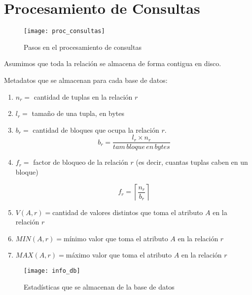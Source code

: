 \documentclass[a4paper, twoside]{article}
\begin{document}
\pagebreak{}


\part{Procesamiento de Consultas}

\noindent \begin{center}
\begin{figure}[H]
\noindent \begin{centering}
\texttt{[image: proc\_consultas]}
\par\end{centering}

\protect\caption{Pasos en el procesamiento de consultas}
\end{figure}

\par\end{center}

Asumimos que toda la relación se almacena de forma contigua en disco.

Metadatos que se almacenan para cada base de datos:
\begin{enumerate}
\item $n_{r}=$ cantidad de tuplas en la relación $r$
\item $l_{r}=$ tamaño de una tupla, en bytes
\item $b_{r}=$ cantidad de bloques que ocupa la relación $r$. 
\[
b_{r}=\frac{l_{r}\times n_{r}}{tam\, bloque\, en\, bytes}
\]

\item $f_{r}=$ factor de bloqueo de la relación $r$ (es decir, cuantas
tuplas caben en un bloque)


\[
f_{r}=\left\lceil \frac{n_{r}}{b_{r}}\right\rceil 
\]


\item $V(A,r)=$cantidad de valores distintos que toma el atributo $A$
en la relación $r$
\item $MIN(A,r)=$mínimo valor que toma el atributo $A$ en la relación
$r$
\item $MAX(A,r)=$máximo valor que toma el atributo $A$ en la relación
$r$
\end{enumerate}
\begin{figure}[H]
\noindent \begin{centering}
\texttt{[image: info\_db]}
\par\end{centering}

\protect\caption{Estadísticas que se almacenan de la base de datos}
\end{figure}
\end{document}
